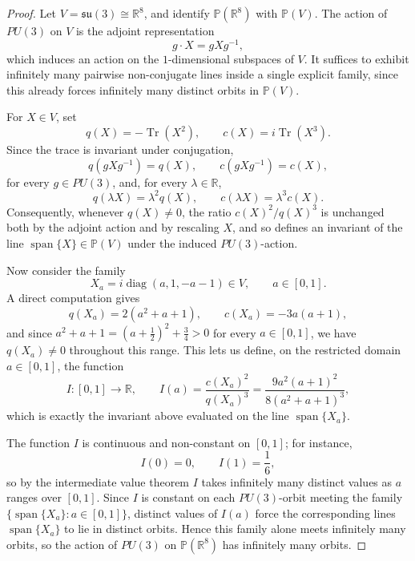 \begin{proof}
    Let \( V = \mathfrak{su}(3) \cong \mathbb{R}^8 \), and identify
    \( \mathbb{P}(\mathbb{R}^8) \) with \( \mathbb{P}(V) \). The action of
    \( PU(3) \) on \( V \) is the adjoint representation
    \[
        g \cdot X = gXg^{-1},
    \]
    which induces an action on the \( 1 \)-dimensional subspaces of
    \( V \). It suffices to exhibit infinitely many pairwise
    non-conjugate lines inside a single explicit family, since this
    already forces infinitely many distinct orbits in \( \mathbb{P}(V) \).

    For \( X \in V \), set
    \[
        q(X) = -\operatorname{Tr}(X^2), \qquad c(X) = i\operatorname{Tr}(X^3).
    \]
    Since the trace is invariant under conjugation,
    \[
        q(gXg^{-1}) = q(X), \qquad c(gXg^{-1}) = c(X),
    \]
    for every \( g \in PU(3) \), and, for every \( \lambda \in \mathbb{R} \),
    \[
        q(\lambda X) = \lambda^2 q(X), \qquad c(\lambda X) = \lambda^3 c(X).
    \]
    Consequently, whenever \( q(X) \neq 0 \), the ratio
    \( c(X)^2/q(X)^3 \) is unchanged both by the adjoint action and by
    rescaling \( X \), and so defines an invariant of the line
    \( \operatorname{span}\{X\} \in \mathbb{P}(V) \) under the induced
    \( PU(3) \)-action.

    Now consider the family
    \[
        X_a = i\operatorname{diag}(a,1,-a-1) \in V, \qquad a \in [0,1].
    \]
    A direct computation gives
    \[
        q(X_a) = 2(a^2+a+1), \qquad c(X_a) = -3a(a+1),
    \]
    and since \( a^2+a+1 = (a+\frac{1}{2})^2 + \frac{3}{4} > 0 \) for
    every \( a \in [0,1] \), we have \( q(X_a) \neq 0 \) throughout
    this range. This lets us define, on the restricted domain \( a
    \in [0,1] \), the
    function
    \[
        I \colon [0,1] \to \mathbb{R}, \qquad
        I(a) = \frac{c(X_a)^2}{q(X_a)^3} = \frac{9a^2(a+1)^2}{8(a^2+a+1)^3},
    \]
    which is exactly the invariant above evaluated on the line
    \( \operatorname{span}\{X_a\} \).

    The function \( I \) is continuous and non-constant on \( [0,1] \);
    for instance,
    \[
        I(0) = 0, \qquad I(1) = \frac{1}{6},
    \]
    so by the intermediate value theorem \( I \) takes infinitely many
    distinct values as \( a \)ranges over \( [0,1] \). Since \( I \) is
    constant on each \( PU(3) \)-orbit meeting the family
    \( \{\operatorname{span}\{X_a\} : a \in [0,1]\} \), distinct values
    of \( I(a) \) force the corresponding lines
    \( \operatorname{span}\{X_a\} \) to lie in distinct orbits. Hence
    this family alone meets infinitely many orbits, so the action of
    \( PU(3) \) on \( \mathbb{P}(\mathbb{R}^8) \) has infinitely many
    orbits.
\end{proof}


